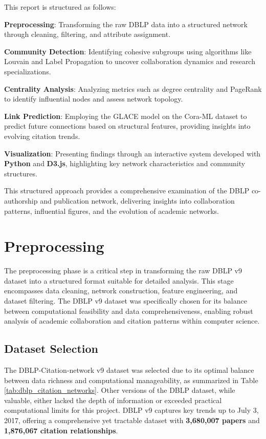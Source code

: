\documentclass[11pt]{article}
\begin{document}
This report is structured as follows:

\textbf{Preprocessing}: Transforming the raw DBLP data into a structured network through cleaning, filtering, and attribute assignment.

\textbf{Community Detection}: Identifying cohesive subgroups using algorithms like Louvain and Label Propagation to uncover collaboration dynamics and research specializations.

\textbf{Centrality Analysis}: Analyzing metrics such as degree centrality and PageRank to identify influential nodes and assess network topology.

\textbf{Link Prediction}: Employing the GLACE model on the Cora-ML dataset to predict future connections based on structural features, providing insights into evolving citation trends.

\textbf{Visualization}: Presenting findings through an interactive system developed with \textbf{Python} and \textbf{D3.js}, highlighting key network characteristics and community structures.

This structured approach provides a comprehensive examination of the DBLP co-authorship and publication network, delivering insights into collaboration patterns, influential figures, and the evolution of academic networks.

\section{Preprocessing}

The preprocessing phase is a critical step in transforming the raw DBLP v9 dataset into a structured format suitable for detailed analysis. This stage encompasses data cleaning, network construction, feature engineering, and dataset filtering. The DBLP v9 dataset was specifically chosen for its balance between computational feasibility and data comprehensiveness, enabling robust analysis of academic collaboration and citation patterns within computer science.

\subsection{Dataset Selection}

The DBLP-Citation-network v9 dataset was selected due to its optimal balance between data richness and computational manageability, as summarized in Table \ref{tab:dblp_citation_networks}. Other versions of the DBLP dataset, while valuable, either lacked the depth of information or exceeded practical computational limits for this project. DBLP v9 captures key trends up to July 3, 2017, offering a comprehensive yet tractable dataset with \textbf{3,680,007 papers} and \textbf{1,876,067 citation relationships}.
\end{document}

